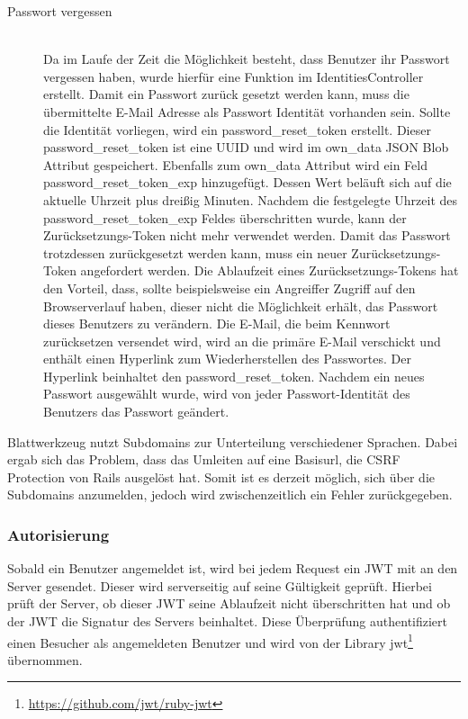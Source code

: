 \begin{description}
	\item[Passwort vergessen]\hfill\\
		Da im Laufe der Zeit die Möglichkeit besteht, dass Benutzer ihr Passwort vergessen haben, wurde hierfür eine Funktion im IdentitiesController erstellt. Damit ein Passwort zurück gesetzt werden kann, muss die übermittelte E-Mail Adresse als Passwort Identität vorhanden sein. Sollte die Identität vorliegen, wird ein password\_reset\_token erstellt. Dieser password\_reset\_token ist eine \gls{UUID} und wird im own\_data JSON Blob Attribut gespeichert. Ebenfalls zum own\_data Attribut wird ein Feld password\_reset\_token\_exp hinzugefügt. Dessen Wert beläuft sich auf die aktuelle Uhrzeit plus drei{\ss}ig Minuten. Nachdem die festgelegte Uhrzeit des password\_reset\_token\_exp Feldes überschritten wurde, kann der Zurücksetzungs-Token nicht mehr verwendet werden. Damit das Passwort trotzdessen zurückgesetzt werden kann, muss ein neuer Zurücksetzungs-Token angefordert werden. Die Ablaufzeit eines Zurücksetzungs-Tokens hat den Vorteil, dass, sollte beispielsweise ein Angreiffer Zugriff auf den Browserverlauf haben, dieser nicht die Möglichkeit erhält, das Passwort dieses Benutzers zu verändern. Die E-Mail, die beim Kennwort zurücksetzen versendet wird, wird an die primäre E-Mail verschickt und enthält einen Hyperlink zum Wiederherstellen des Passwortes. Der Hyperlink beinhaltet den password\_reset\_token. Nachdem ein neues Passwort ausgewählt wurde, wird von jeder Passwort-Identität des Benutzers das Passwort geändert.
\end{description}

Blattwerkzeug nutzt Subdomains zur Unterteilung verschiedener Sprachen. Dabei ergab sich das Problem, dass das Umleiten auf eine Basisurl, die \gls{CSRF} Protection von Rails ausgelöst hat. Somit ist es derzeit möglich, sich über die Subdomains anzumelden, jedoch wird zwischenzeitlich ein Fehler zurückgegeben.

\subsubsection{Autorisierung}
\label{sec:server-authorisation}
Sobald ein Benutzer angemeldet ist, wird bei jedem Request ein \gls{JWT} mit an den Server gesendet. Dieser wird serverseitig auf seine Gültigkeit geprüft. Hierbei prüft der Server, ob dieser \gls{JWT} seine Ablaufzeit nicht überschritten hat und ob der \gls{JWT} die Signatur des Servers beinhaltet. Diese Überprüfung authentifiziert einen Besucher als angemeldeten Benutzer und wird von der Library jwt\footnote{\url{https://github.com/jwt/ruby-jwt}} übernommen.

